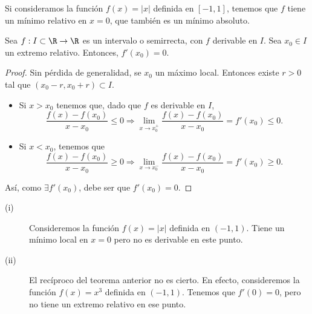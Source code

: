 \begin{eg}
	\normalfont Si consideramos la función $\displaystyle f\left(x\right) = \left|x\right| $ definida en $\displaystyle \left[-1,1\right]  $, tenemos que $\displaystyle f $ tiene un mínimo relativo en $\displaystyle x = 0 $, que también es un mínimo absoluto.
\end{eg}
\begin{ftheorem}[]
\normalfont Sea $\displaystyle f : I \subset \R \to \R  $ es un intervalo o semirrecta, con $\displaystyle f $ derivable en $\displaystyle I $. Sea $\displaystyle x_{0} \in I $ un extremo relativo. Entonces, $\displaystyle f'\left(x_{0}\right) = 0 $.
\end{ftheorem}
\begin{proof}
Sin pérdida de generalidad, se $\displaystyle x_{0} $ un máximo local. Entonces existe $\displaystyle r > 0 $ tal que $\displaystyle \left(x_{0}-r, x_{0}+r\right) \subset I $. 
\begin{itemize}
\item Si $\displaystyle x > x_{0} $ tenemos que, dado que $\displaystyle f $ es derivable en $\displaystyle I $,
	\[ \frac{f\left(x\right)-f\left(x_{0}\right)}{x-x_{0}} \leq 0 \Rightarrow \lim_{x \to x_{0}^{+}}\frac{f\left(x\right)-f\left(x_{0}\right)}{x-x_{0}} = f'\left(x_{0}\right) \leq 0 .\]
\item Si $\displaystyle x < x_{0} $, tenemos que
	\[ \frac{f\left(x\right)-f\left(x_{0}\right)}{x-x_{0}} \geq 0 \Rightarrow \lim_{x \to x_{0}^{-}}\frac{f\left(x\right)-f\left(x_{0}\right)}{x-x_{0}} = f'\left(x_{0}\right) \geq 0 .\]
\end{itemize}
Así, como $\displaystyle \exists f'\left(x_{0}\right) $, debe ser que $\displaystyle f'\left(x_{0}\right) = 0 $.
\end{proof}
\begin{eg}
\normalfont 
\begin{description}
\item[(i)] Consideremos la función $\displaystyle f\left(x\right) = \left|x\right| $ definida en $\displaystyle \left(-1, 1\right) $. Tiene un mínimo local en $\displaystyle x= 0 $ pero no es derivable en este punto.
\item[(ii)] El recíproco del teorema anterior no es cierto. En efecto, consideremos la función $\displaystyle f\left(x\right) = x^{3} $ definida en $\displaystyle \left(-1,1\right) $. Tenemos que $\displaystyle f'\left(0\right) = 0 $, pero no tiene un extremo relativo en ese punto.
\end{description}
\end{eg}
